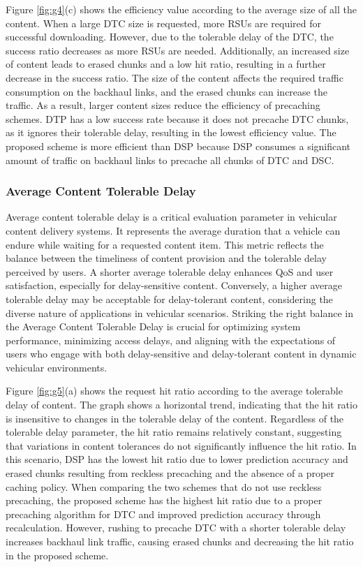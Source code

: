 \documentclass[journal]{IEEEtran}
\begin{document}
Figure \ref{fig:g4}(c) shows the efficiency value according to the average size of all the content.
When a large DTC size is requested, more RSUs are required for successful downloading.
However, due to the tolerable delay of the DTC, the success ratio decreases as more RSUs are needed.
Additionally, an increased size of content leads to erased chunks and a low hit ratio, resulting in a further decrease in the success ratio.
The size of the content affects the required traffic consumption on the backhaul links, and the erased chunks can increase the traffic.
As a result, larger content sizes reduce the efficiency of precaching schemes.
DTP has a low success rate because it does not precache DTC chunks, as it ignores their tolerable delay, resulting in the lowest efficiency value.
The proposed scheme is more efficient than DSP because DSP consumes a significant amount of traffic on backhaul links to precache all chunks of DTC and DSC.


\subsubsection{Average Content Tolerable Delay}
Average content tolerable delay is a critical evaluation parameter in vehicular content delivery systems.
It represents the average duration that a vehicle can endure while waiting for a requested content item.
This metric reflects the balance between the timeliness of content provision and the tolerable delay perceived by users.
A shorter average tolerable delay enhances QoS and user satisfaction, especially for delay-sensitive content.
Conversely, a higher average tolerable delay may be acceptable for delay-tolerant content, considering the diverse nature of applications in vehicular scenarios.
Striking the right balance in the Average Content Tolerable Delay is crucial for optimizing system performance, minimizing access delays, and aligning with the expectations of users who engage with both delay-sensitive and delay-tolerant content in dynamic vehicular environments.

Figure \ref{fig:g5}(a) shows the request hit ratio according to the average tolerable delay of content.
The graph shows a horizontal trend, indicating that the hit ratio is insensitive to changes in the tolerable delay of the content.
Regardless of the tolerable delay parameter, the hit ratio remains relatively constant, suggesting that variations in content tolerances do not significantly influence the hit ratio.
In this scenario, DSP has the lowest hit ratio due to lower prediction accuracy and erased chunks resulting from reckless precaching and the absence of a proper caching policy.
When comparing the two schemes that do not use reckless precaching, the proposed scheme has the highest hit ratio due to a proper precaching algorithm for DTC and improved prediction accuracy through recalculation.
However, rushing to precache DTC with a shorter tolerable delay increases backhaul link traffic, causing erased chunks and decreasing the hit ratio in the proposed scheme.
\end{document}

